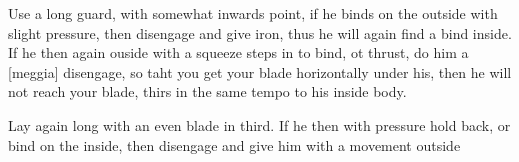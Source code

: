 \exercise{}
Use a long guard, with somewhat inwards point, if he binds on the
outside with slight pressure, then disengage and give iron, thus he
will again find a bind inside. If he then again ouside with a squeeze
steps in to bind, ot thrust, do him a [meggia] disengage, so taht you
get your blade horizontally under his, then he will not reach your
blade, thirs in the same tempo to his inside body.

\exercise{}
Lay again long with an even blade in third. If he then with pressure
hold back, or bind on the inside, then disengage and give him with a
movement outside
